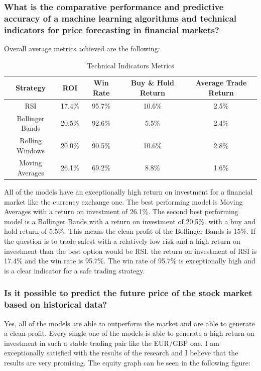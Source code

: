\documentclass{imc-inf}
\begin{document}
		\subsubsection{
			What is the comparative performance and predictive accuracy of a machine learning
			algorithms and technical indicators for price forecasting in financial markets?
			}
		Overall average metrics achieved are the following:
		\begin{table}[h!]
			\centering
			\begin{tabular}{|c|c|c|c|c|}
					\hline
					\textbf{Strategy} &		\textbf{ROI} & \textbf{Win Rate} & \textbf{Buy \& Hold Return} & \textbf{Average Trade Return} \\ \hline
					RSI             				 & 17.4\% & 95.7\% & 10.6\% & 2.5\%  \\ \hline
					Bollinger Bands            				 & 20.5\% & 92.6\%  & 5.5\% & 2.4\% \\ \hline
					Rolling Windows      	 				 &  20.0\% & 90.5\% & 10.6\% & 2.8\% \\ \hline
					Moving Averages        		 				 & 26.1\% & 69.2\% & 8.8\% & 1.6\% \\ \hline
			\end{tabular}
			\caption{Technical Indicators Metrics}
			\label{tab:technical_indicators_metrics}
		\end{table}

		All of the models have an exceptionally high return on investment for a financial market like the currency exchange one. The best performing model is Moving Averages with a return on investment of 26.1\%.
		The second best performing model is a Bollinger Bands with a return on investment of 20.5\%. with a buy and hold return of 5.5\%. This means the clean profit of the Bollinger Bands is 15\%.
		If the question is to trade safest with a relatively low risk and a high return on investment than the best option would be RSI. the return on investment of RSI is 17.4\% and the win rate is 95.7\%.
		The win rate of 95.7\% is exceptionally high and is a clear indicator for a safe trading strategy. 
		\subsubsection{Is it possible to predict the future price of the stock market based on historical data?}
			Yes, all of the models are able to outperform the market and are able to generate a clean profit. Every single one of the models is able to generate a high return on investment in such a stable trading pair like the EUR/GBP one. 
			I am exceptionally satisfied with the results of the research and I believe that the results are very promising. 
			The equity graph can be seen in the following figure:
			
\end{document}
